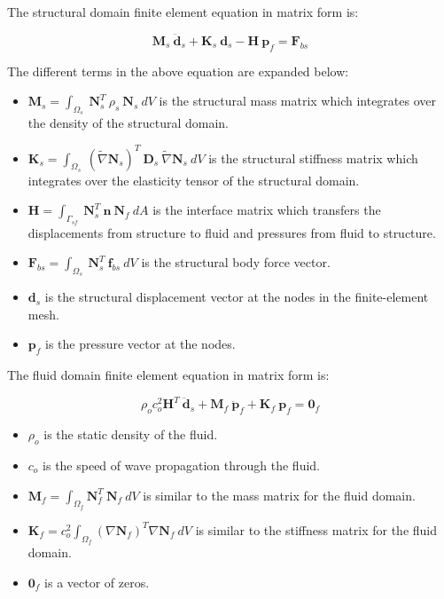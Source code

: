 \documentclass[3p]{elsarticle}
\begin{document}
\noindent The structural domain finite element equation in matrix form is:

\begin{equation}
    \label{eqn:summ_1}
    \mathbf{M}_s~\mathbf{\ddot{d}}_s + \mathbf{K}_s~\mathbf{d}_s - \mathbf{H}~\mathbf{p}_f = \mathbf{F}_{bs}
\end{equation}

\noindent The different terms in the above equation are expanded below:

\begin{itemize}
    \item $\mathbf{M}_s = \int_{\Omega_s}~\mathbf{N}_s^T~\rho_s~\mathbf{N}_s~dV$ is the structural mass matrix which integrates over the density of the structural domain.
    \item $\mathbf{K}_s = \int_{\Omega_s}~(\widetilde{\nabla}\mathbf{N}_s)^T~ \mathbf{D}_s~\widetilde{\nabla}\mathbf{N}_s~dV$ is the structural stiffness matrix which integrates over the elasticity tensor of the structural domain.
    \item $\mathbf{H} = \int_{\Gamma_{sf}}~\mathbf{N}_s^T~\mathbf{n}~\mathbf{N}_f~dA$ is the interface matrix which transfers the displacements from structure to fluid and pressures from fluid to structure.
    \item $\mathbf{F}_{bs} = \int_{\Omega_s}~\mathbf{N}_s^T~\mathbf{f}_{bs}~dV$ is the structural body force vector.
    \item $\mathbf{d}_s$ is the structural displacement vector at the nodes in the finite-element mesh.
    \item $\mathbf{p}_f$ is the pressure vector at the nodes.
\end{itemize}

\noindent The fluid domain finite element equation in matrix form is:

\begin{equation}
    \label{eqn:summ_2}
    \rho_o c_o^2 \mathbf{H}^T~\mathbf{\ddot{d}}_s + \mathbf{M}_f~\mathbf{\ddot{p}}_f + \mathbf{K}_f~\mathbf{p}_f = \mathbf{0}_f
\end{equation}


\begin{itemize}
    \item $\rho_o$ is the static density of the fluid.
    \item $c_o$ is the speed of wave propagation through the fluid.
    \item $\mathbf{M}_f = \int_{\Omega_f} \mathbf{N}_f^T~\mathbf{N}_f~dV$ is similar to the mass matrix for the fluid domain.
    \item $\mathbf{K}_f = c_o^2 \int_{\Omega_f} (\nabla \mathbf{N}_f)^T \nabla \mathbf{N}_f~dV$ is similar to the stiffness matrix for the fluid domain.
    \item $\mathbf{0}_f$ is a vector of zeros.
\end{itemize}
\end{document}
